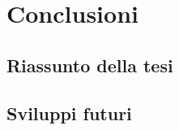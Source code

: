 \chapter{Conclusioni}
\label{chap:conclusioni}

\acresetall


\section{Riassunto della tesi}

%
%
%
%

\section{Sviluppi futuri}

